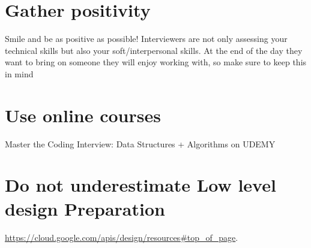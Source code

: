 \section{Gather positivity}
Smile and be as positive as possible! Interviewers are not only assessing your technical skills but also your soft/interpersonal skills.
At the end of the day they want to bring on someone they will enjoy working with, so make sure to keep this in mind

\section{Use online courses}
Master the Coding Interview: Data Structures + Algorithms on UDEMY

\section{Do not underestimate Low level design Preparation}
\url{https://cloud.google.com/apis/design/resources#top_of_page}.